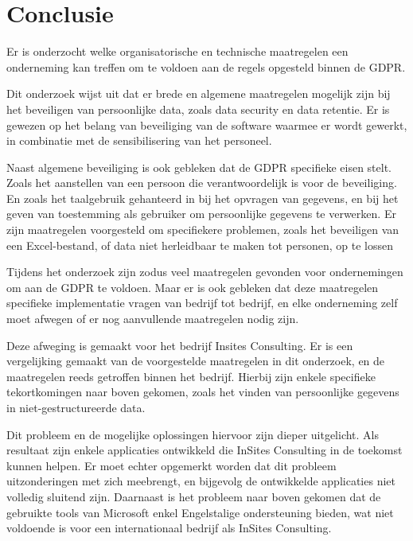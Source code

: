 
\chapter{Conclusie}
\label{ch:conclusie}

Er is onderzocht welke organisatorische en technische maatregelen een onderneming kan treffen om te voldoen aan de regels opgesteld binnen de GDPR. 

Dit onderzoek wijst uit dat er brede en algemene maatregelen mogelijk zijn bij het beveiligen van persoonlijke data, zoals data security en data retentie. 
Er is gewezen op het belang van beveiliging van de software waarmee er wordt gewerkt, in combinatie met de sensibilisering van het personeel. 

Naast algemene beveiliging is ook gebleken dat de GDPR specifieke eisen stelt. Zoals het aanstellen van een persoon die verantwoordelijk is voor de beveiliging. En zoals het taalgebruik gehanteerd in bij het opvragen van gegevens, en bij het geven van toestemming als gebruiker om persoonlijke gegevens te verwerken. 
Er zijn maatregelen voorgesteld om specifiekere problemen, zoals het beveiligen van een Excel-bestand, of data niet herleidbaar te maken tot personen, op te lossen  

Tijdens het onderzoek zijn zodus veel maatregelen gevonden voor ondernemingen om aan de GDPR te voldoen. Maar er is ook gebleken dat deze maatregelen specifieke implementatie vragen van bedrijf tot bedrijf, en elke onderneming zelf moet afwegen of er nog aanvullende maatregelen nodig zijn. 

Deze afweging is gemaakt voor het bedrijf Insites Consulting. Er is een vergelijking gemaakt van de voorgestelde maatregelen in dit onderzoek, en de maatregelen reeds getroffen binnen het bedrijf. Hierbij zijn enkele specifieke tekortkomingen naar boven gekomen, zoals het vinden van persoonlijke gegevens in niet-gestructureerde data. 

Dit probleem en de mogelijke oplossingen hiervoor zijn dieper uitgelicht. Als resultaat zijn enkele applicaties ontwikkeld die InSites Consulting in de toekomst kunnen helpen. Er moet echter opgemerkt worden dat dit probleem uitzonderingen met zich meebrengt, en bijgevolg de ontwikkelde applicaties niet volledig sluitend zijn. Daarnaast is het probleem naar boven gekomen dat de gebruikte tools van Microsoft enkel Engelstalige ondersteuning bieden, wat niet voldoende is voor een internationaal bedrijf als InSites Consulting. 

 



